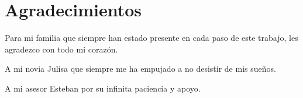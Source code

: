 \chapter{Agradecimientos}

    Para mi familia que siempre han estado presente en cada paso de este trabajo, les agradezco con todo mi corazón. 

    A mi novia Julisa que siempre me ha empujado a no desistir de mis sueños.

    A mi asesor Esteban por su infinita paciencia y apoyo.
